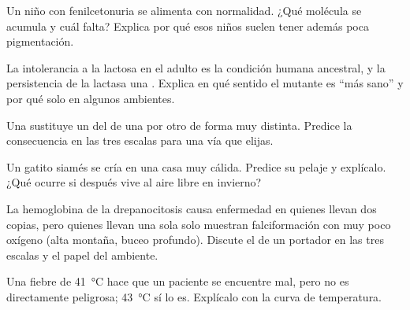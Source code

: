 \begin{exercise}[$\star\star$]\label{exo:g11:enzymes-and-phenotype:8}
Un niño con fenilcetonuria se alimenta con normalidad. ¿Qué molécula se
acumula y cuál falta? Explica por qué esos niños suelen tener además
poca pigmentación.
\end{exercise}

\begin{exercise}[$\star\star$]\label{exo:g11:enzymes-and-phenotype:9}
La intolerancia a la lactosa en el adulto es la condición humana
ancestral, y la persistencia de la lactasa una . Explica en qué
sentido el  mutante es ``más sano'' y por qué solo en algunos
ambientes.
\end{exercise}

\begin{exercise}[$\star\star$]\label{exo:g11:enzymes-and-phenotype:10}
Una  sustituye un  del  de una 
por otro de forma muy distinta. Predice la consecuencia en las tres
escalas para una vía que elijas.
\end{exercise}

\begin{exercise}[$\star\star$]\label{exo:g11:enzymes-and-phenotype:11}
Un gatito siamés se cría en una casa muy cálida. Predice su pelaje y
explícalo. ¿Qué ocurre si después vive al aire libre en invierno?
\end{exercise}

\begin{exercise}[$\star\star\star$]\label{exo:g11:enzymes-and-phenotype:12}
La hemoglobina de la drepanocitosis causa enfermedad en quienes llevan
dos copias, pero quienes llevan una sola solo muestran falciformación
con muy poco oxígeno (alta montaña, buceo profundo). Discute el
 de un portador en las tres escalas y el papel del ambiente.
\end{exercise}

\begin{exercise}[$\star\star\star$]\label{exo:g11:enzymes-and-phenotype:13}
Una fiebre de \qty{41}{\celsius} hace que un paciente se encuentre mal,
pero no es directamente peligrosa; \qty{43}{\celsius} sí lo es.
Explícalo con la curva de temperatura.
\end{exercise}

